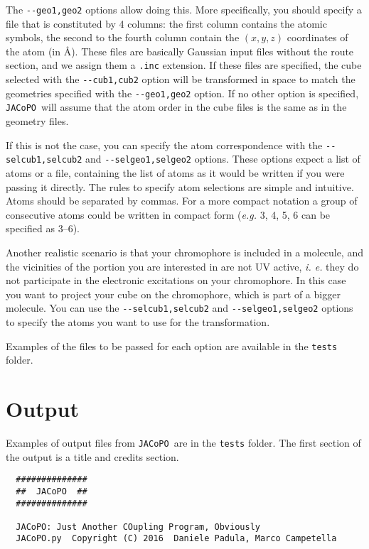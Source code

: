 \documentclass[a4paper]{article}
\newcommand{\jacopo}{\texttt{JACoPO}}
\begin{document}
The \verb|--geo1,geo2| options allow doing this. More specifically, you should specify a file that is constituted by 4 columns: the first column contains the atomic symbols, the second to the fourth column contain the $(x, y, z)$ coordinates of the atom (in \AA{}). These files are basically Gaussian input files without the route section, and we assign them a \verb|.inc| extension. If these files are specified, the cube selected with the \verb|--cub1,cub2| option will be transformed in space to match the geometries specified with the \verb|--geo1,geo2| option. If no other option is specified, \jacopo\ will assume that the atom order in the cube files is the same as in the geometry files.

If this is not the case, you can specify the atom correspondence with the \verb|--selcub1,selcub2| and \verb|--selgeo1,selgeo2| options. These options expect a list of atoms or a file, containing the list of atoms as it would be written if you were passing it directly. The rules to specify atom selections are simple and intuitive. Atoms should be separated by commas. For a more compact notation a group of consecutive atoms could be written in compact form (\textit{e.g.} 3, 4, 5, 6 can be specified as 3--6).

Another realistic scenario is that your chromophore is included in a molecule, and the vicinities of the portion you are interested in are not UV active, \textit{i. e.} they do not participate in the electronic excitations on your chromophore. In this case you want to project your cube on the chromophore, which is part of a bigger molecule. You can use the \verb|--selcub1,selcub2| and \verb|--selgeo1,selgeo2| options to specify the atoms you want to use for the transformation.

Examples of the files to be passed for each option are available in the \verb|tests| folder.

\section*{Output}
Examples of output files from \jacopo\ are in the \verb|tests| folder. The first section of the output is a title and credits section.

\begin{verbatim}
  ##############
  ##  JACoPO  ##
  ##############
  
  JACoPO: Just Another COupling Program, Obviously
  JACoPO.py  Copyright (C) 2016  Daniele Padula, Marco Campetella
\end{verbatim}
\end{document}
